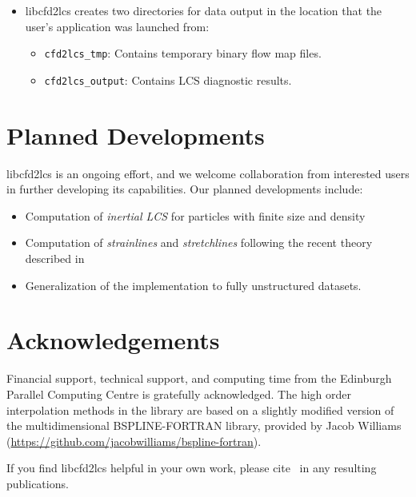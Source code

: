 \documentclass[letterpaper,11pt]{article}
\begin{document}
\begin{itemize}
\item libcfd2lcs creates two directories for data output in the location that the user's application was launched from:
\begin{itemize}
 \item \verb|cfd2lcs_tmp|:   Contains temporary binary flow map files.
 \item \verb|cfd2lcs_output|:   Contains LCS diagnostic results.
\end{itemize}
\end{itemize}

\section{Planned Developments}
libcfd2lcs is an ongoing effort, and we welcome collaboration from interested users in further developing its capabilities.  Our planned developments include:
\begin{itemize}
 \item Computation of \emph{inertial LCS} for particles with finite size and density
 \item Computation of \emph{strainlines} and \emph{stretchlines} following the recent theory described in~\cite{haller2015lagrangian}
 \item Generalization of the implementation to fully unstructured datasets.
 \end{itemize}

\section{Acknowledgements}  Financial support, technical support, and computing time from the Edinburgh Parallel Computing Centre is gratefully acknowledged.   The high order interpolation methods in the library are based on a slightly modified version of the multidimensional BSPLINE-FORTRAN library, provided by Jacob Williams (\href{https://github.com/jacobwilliams/bspline-fortran}{https://github.com/jacobwilliams/bspline-fortran}).   

If you find libcfd2lcs helpful in your own work, please cite~\cite{finn2013integrated} in any resulting publications.
 
 


\end{document}
